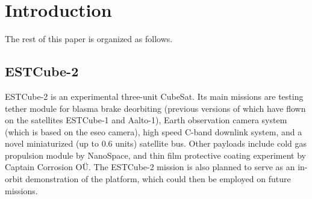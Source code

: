 \newpage
\section{Introduction}




The rest of this paper is organized as follows.


\subsection{ESTCube-2}

ESTCube-2 is an experimental three-unit CubeSat. Its main missions are testing tether module for blasma brake deorbiting (previous versions of which have flown on the satellites ESTCube-1 and Aalto-1), Earth observation camera system (which is based on the \gls{eseo} camera), high speed C-band downlink system, and a novel miniaturized (up to 0.6 units) satellite bus. Other payloads include cold gas propulsion module by NanoSpace, and thin film protective coating experiment by Captain Corrosion OÜ. The ESTCube-2 mission is also planned to serve as an in-orbit demonstration of the platform, which could then be employed on future missions. \cite{Iakubivskyi2016}

